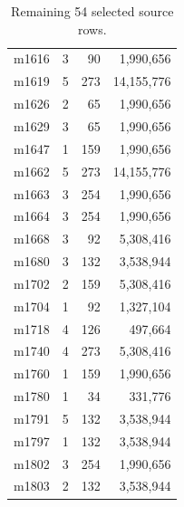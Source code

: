 \documentclass[10pt,a4paper]{article}
\begin{document}
\begin{table}[h!]
\begin{tabular}{lrrr}
m1616 & 3 & 90 & 1,990,656\\
m1619 & 5 & 273 & 14,155,776\\
m1626 & 2 & 65 & 1,990,656\\
m1629 & 3 & 65 & 1,990,656\\
m1647 & 1 & 159 & 1,990,656\\
m1662 & 5 & 273 & 14,155,776\\
m1663 & 3 & 254 & 1,990,656\\
m1664 & 3 & 254 & 1,990,656\\
m1668 & 3 & 92 & 5,308,416\\
m1680 & 3 & 132 & 3,538,944\\
m1702 & 2 & 159 & 5,308,416\\
m1704 & 1 & 92 & 1,327,104\\
m1718 & 4 & 126 & 497,664\\
m1740 & 4 & 273 & 5,308,416\\
m1760 & 1 & 159 & 1,990,656\\
m1780 & 1 & 34 & 331,776\\
m1791 & 5 & 132 & 3,538,944\\
m1797 & 1 & 132 & 3,538,944\\
m1802 & 3 & 254 & 1,990,656\\
m1803 & 2 & 132 & 3,538,944\\
\bottomrule\end{tabular}\caption{Remaining 54 selected source rows.}\label{tab:second}\end{table}
\end{document}
